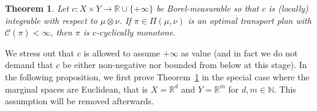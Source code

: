 \documentclass[leqno, 11pt, a4paper]{amsart}
\newtheorem{thm}{Theorem}
\theoremstyle{definition}
\newcommand{\R}{\mathbb{R}}
\newcommand{\C}{\mathscr{C}}
\newcommand{\N}{\mathbb{N}}
\newcommand{\extendedR}{\R \cup \{+\infty\}}
\begin{document}
\begin{thm}\label{thm:best-thm-necessary}
	Let $c : X \times Y \to \extendedR$ be Borel-measurable so that $c$ is (locally) integrable with respect to $\mu \otimes \nu$. If $\pi \in \Pi(\mu, \nu)$ is an optimal transport plan with $\C(\pi) < \infty$, then $\pi$ is $c$-cyclically monotone.
\end{thm}

We stress out that $c$ is allowed to assume $+\infty$ as value (and in fact we do not demand that $c$ be either non-negative nor bounded from below at this stage). In the following proposition, we first prove Theorem~\ref{thm:best-thm-necessary} in the special case where the marginal spaces are Euclidean, that is $X = \R^d$ and $Y = \R^m$ for $d, m \in \N$. This assumption will be removed afterwards.
\end{document}
